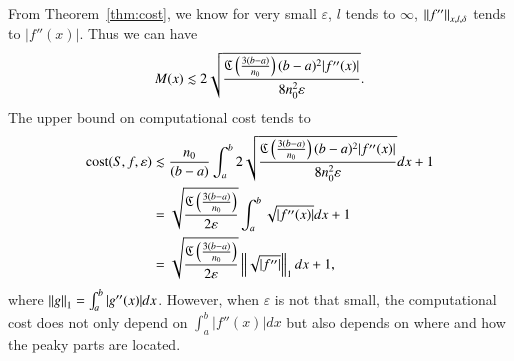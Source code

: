 From Theorem~\ref{thm:cost}, we know for very small $\varepsilon$,
$l$ tends to $\infty$, $\norm[x,l,\delta]{f''}$ tends to $|f''(x)|$.
Thus we can have
$$ M(x) \lesssim 2\sqrt{\frac{\fC\left(\frac{3(b-a)}{n_0}\right)  (b-a)^2 |f''(x)|}{8n^2_0\varepsilon}}.$$
The upper bound on computational cost tends to
\begin{align*}
\cost(S,f,\varepsilon)  & \lesssim \frac{n_0}{(b-a)}\int_a^b 2\sqrt{\frac{\fC\left(\frac{3(b-a)}{n_0}\right)  (b-a)^2 |f''(x)|}{8n^2_0\varepsilon}} dx +1 \\
& =\sqrt{\frac{\fC\left(\frac{3(b-a)}{n_0}\right)}{2\varepsilon}}\int_a^b \sqrt{|f''(x)|} dx +1\\
& =\sqrt{\frac{\fC\left(\frac{3(b-a)}{n_0}\right)}{2\varepsilon}}\norm[1]{\sqrt{|f''|}} dx +1,
\end{align*}
where $\norm[1]{g}=\int_a^b |g''(x)| dx$.
However, when $\varepsilon$ is not that small, the computational cost does not only depend on $\int_a^b|f''(x)|dx$ but also depends on where and how the peaky parts are located.\\